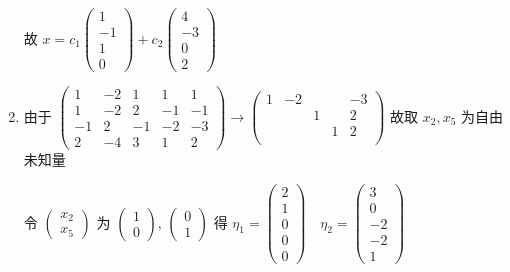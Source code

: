 \begin{enumerate}
			       故 \( x = c_{1}\begin{pmatrix}
				       1  \\
				       -1 \\
				       1  \\
				       0
			       \end{pmatrix} + c_{2}\begin{pmatrix}
				       4  \\
				       -3 \\
				       0  \\
				       2
			       \end{pmatrix} \)
			 \item %
			       由于 \( \begin{pmatrix}
				       1  & -2 & 1  & 1  & 1  \\
				       1  & -2 & 2  & -1 & -1 \\
				       -1 & 2  & -1 & -2 & -3 \\
				       2  & -4 & 3  & 1  & 2
			       \end{pmatrix} \rightarrow \begin{pmatrix}
				       1 & -2 &   &   & -3 \\
				         &    & 1 &   & 2  \\
				         &    &   & 1 & 2  \\
				         &    &   &   &
			       \end{pmatrix} \) 故取 \( x_{2}, x_{5} \) 为自由未知量

			       令 \( \begin{pmatrix}
				       x_{2} \\
				       x_{5}
			       \end{pmatrix} \) 为 \( \begin{pmatrix}
				       1 \\
				       0
			       \end{pmatrix} \), \( \begin{pmatrix}
				       0 \\
				       1
			       \end{pmatrix} \) 得 \( \eta_{1} = \begin{pmatrix}
				       2 \\
				       1 \\
				       0 \\
				       0 \\
				       0
			       \end{pmatrix} \quad \eta_{2} = \begin{pmatrix}
				       3  \\
				       0  \\
				       -2 \\
				       -2 \\
				       1
			       \end{pmatrix} \)


\end{enumerate}

